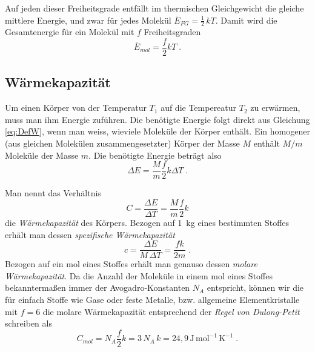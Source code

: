 Auf jeden dieser Freiheitsgrade entfällt im thermischen Gleichgewicht die gleiche mittlere Energie, und zwar für jedes Molekül $\overline{E}_{FG}= \frac{1}{2}\, kT$. Damit wird die Gesamtenergie für ein Molekül mit $f$ Freiheitsgraden
\begin{equation} \label{eq:DefW}
 \overline{E}_{mol} = \frac{f}{2}kT\; .
\end{equation}

\subsection{Wärmekapazität}

Um einen Körper von der Temperatur $T_1$ auf die Tempereatur $T_2$ zu erwärmen, muss man ihm Energie zuführen. Die benötigte Energie folgt direkt aus Gleichung \ref{eq:DefW}, wenn man weiss, wieviele Moleküle der Körper enthält. Ein homogener (aus gleichen Molekülen zusammengesetzter) Körper der Masse $M$ enthält $M/m$ Moleküle der Masse $m$. Die benötigte Energie beträgt also
\begin{equation}
 \Delta E = \frac{M}{m}\frac{f}{2}k\Delta T\; .
\end{equation}

Man nennt das Verhältnis 
\begin{equation}
 C = \frac{\Delta E}{\Delta T} = \frac{M}{m}\frac{f}{2}k
\end{equation}
die \textit{Wärmekapazität} des Körpers. Bezogen auf 1~kg eines bestimmten Stoffes erhält man dessen \textit{spezifische Wärmekapazität} 
\begin{equation} \label{eq:spez_Waermekapazitaet}
 c = \frac{\Delta E}{M\,\Delta T} = \frac{fk}{2m}\; .
\end{equation}
Bezogen auf ein mol eines Stoffes erhält man genauso dessen \textit{molare Wärmekapazität}. Da die Anzahl der Moleküle in einem mol eines Stoffes bekanntermaßen immer der Avogadro-Konstanten $N_A$ entspricht, können wir die für einfach Stoffe wie Gase oder feste Metalle, bzw. allgemeine Elementkristalle mit $f=6$ die molare Wärmekapazität entsprechend der \textit{Regel von Dulong-Petit} schreiben als
\begin{equation} \label{eq:Dulong-Petit}
 C_{mol} = N_A\frac{f}{2}k = 3\,N_A\,k = 24,9\,\mathrm{J\,mol^{-1}\,K^{-1}}\; .
\end{equation}

